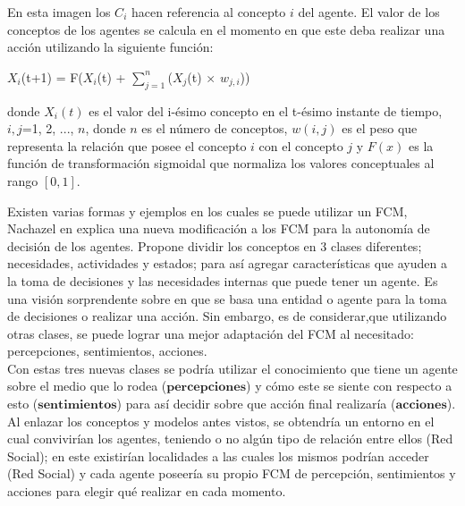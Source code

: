 En esta imagen los $C_{i}$ hacen referencia al concepto $i$ del agente. El valor de los conceptos de los agentes se 
calcula en el momento en que este deba realizar una acción utilizando la siguiente función:
\begin{center}
    $X_{i}$(t+1) = F($X_{i}$(t) + $\sum_{j=1}^{n}${($X_{j}$(t) $\times$ $w_{j,i}$)})
\end{center}

donde $X_{i} (t)$ es el valor del i-ésimo concepto en el t-ésimo instante de tiempo, $i,j$=1, 2, ..., $n$, donde $n$ es el número
de conceptos, $w(i,j)$ es el peso que representa la relación que posee el concepto $i$ con el concepto $j$ y $F(x)$ es la función 
de transformación sigmoidal que normaliza los valores conceptuales al rango $[0,1]$. \autocite{Poczeta2020}

Existen varias formas y ejemplos en los cuales se puede utilizar un FCM, Nachazel en \autocite{Nachazel2021}
explica una nueva modificación a los FCM para la autonomía de decisión de los agentes. Propone dividir los conceptos en 3 clases
diferentes; necesidades, actividades y estados; para así agregar características que ayuden a la toma de decisiones y las necesidades 
internas que puede tener un agente. Es una visión sorprendente sobre en que se basa una entidad
o agente para la toma de decisiones o realizar una acción. Sin embargo, es de considerar,que utilizando otras clases, se 
puede lograr una mejor adaptación del FCM al necesitado: percepciones, sentimientos, acciones.\\ 
Con estas tres nuevas clases se podría utilizar el conocimiento que tiene un agente sobre el medio que lo rodea ($\textbf{percepciones}$) y  
cómo este se siente con respecto a esto ($\textbf{sentimientos}$) para así decidir sobre que acción final realizaría ($\textbf{acciones}$).\\

Al enlazar los conceptos y modelos antes vistos, se obtendría un entorno en el cual convivirían los agentes, teniendo o no algún
tipo de relación entre ellos (Red Social); en este existirían localidades a las cuales los mismos podrían acceder (Red Social) y 
cada agente poseería su propio FCM de percepción, sentimientos y acciones para elegir qué realizar en cada momento.